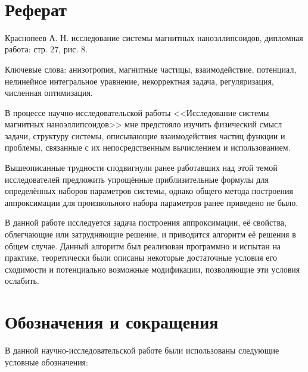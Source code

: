 \documentclass[a4paper,14pt]{extarticle}
\begin{document}

    \

    \newpage

    \tableofcontents

    \newpage

    \section*{Реферат}

    Краснопеев А. Н. исследование системы магнитных наноэллипсоидов,
    дипломная работа: стр. 27, рис. 8.

    Ключевые слова: анизотропия, магнитные частицы,
    взаимодействие, потенциал, нелинейное интегральное уравнение,
    некорректная задача, регуляризация, численная оптимизация.

    В процессе научно-исследовательской работы
    <<Исследование системы магнитных наноэллипсоидов>>
    мне предстояло изучить физический смысл задачи, структуру системы,
    описывающие взаимодействия частиц функции и проблемы, связанные с их
    непосредственным вычислением и использованием.

    Вышеописанные трудности сподвигнули ранее работавших над этой темой
    исследователей предложить упрощённые приблизительные формулы для
    определённых наборов параметров системы, однако общего метода
    построения аппроксимации для произвольного набора параметров ранее
    приведено не было.

    В данной работе исследуется задача построения аппроксимации,
    её свойства, облегчающие или затрудняющие решение, и приводится алгоритм
    её решения в общем случае.
    Данный алгоритм был реализован программно и испытан на практике,
    теоретически были описаны некоторые достаточные условия его сходимости
    и потенциально возможные модификации, позволяющие эти условия ослабить.

    \newpage

    \section*{Обозначения и сокращения}

    В данной научно-исследовательской работе были использованы следующие
    условные обозначения:
\end{document}
